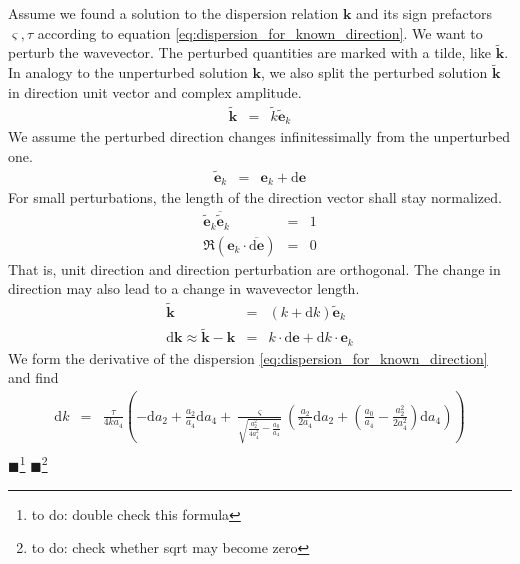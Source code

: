 \documentclass[12pt,a4paper,twoside,openright,BCOR10mm,headsepline,titlepage,abstracton,chapterprefix,final]{scrreprt}
\newcommand\Vector[1]{{\mathbf{#1}}}
\newcommand\wavenumber{k}
\newcommand\Wavevector{\Vector{\wavenumber}}
\newcommand{\remark}[1]{{\color{red}$\blacksquare$}\footnote{{\color{red}#1}}}
\newcommand\totald{\textrm{d}}
\begin{document}
Assume we found a solution to the dispersion relation $\Wavevector$ and its sign prefactors $\varsigma, \tau$ according to equation \eqref{eq:dispersion_for_known_direction}.
We want to perturb the wavevector. 
The perturbed quantities are marked with a tilde, like $\tilde{\Wavevector}$.
In analogy to the unperturbed solution $\Wavevector$, we also split the perturbed solution $\tilde{\Wavevector}$
in direction unit vector and complex amplitude.
\begin{eqnarray}
 \tilde{\Wavevector} &=& \tilde{\wavenumber} \tilde{\Vector{e}}_{\wavenumber}
\end{eqnarray}
We assume the perturbed direction changes infinitessimally from the unperturbed one.
\begin{eqnarray}
 \tilde{\Vector{e}}_\wavenumber &=& \Vector{e}_\wavenumber + \totald\Vector{e} 
\end{eqnarray}
For small perturbations, the length of the direction vector shall stay normalized.
\begin{eqnarray}
 \tilde{\Vector{e}}_\wavenumber \overline{\tilde{\Vector{e}}}_\wavenumber &=& 1 \\
 \Re \left( \Vector{e}_\wavenumber \cdot \overline{\totald\Vector{e}} \right) &=& 0 \label{eq:perturbation_unit_orthogonality}
\end{eqnarray}
That is, unit direction and direction perturbation are orthogonal.
The change in direction may also lead to a change in wavevector length.
\begin{eqnarray}
 \tilde{\Wavevector} &=& 
     \left( 
         \wavenumber + \totald \wavenumber 
     \right)
     \tilde{\Vector{e}}_\wavenumber 
 \\
 \totald \Wavevector \approx \tilde{\Wavevector} - \Wavevector &=& \wavenumber \cdot \totald\Vector{e} + \totald \wavenumber \cdot \Vector{e}_\wavenumber
\end{eqnarray}
We form the derivative of the dispersion \ref{eq:dispersion_for_known_direction} and find
\begin{eqnarray}
 \totald \wavenumber &=&
     \frac{\tau}{4 \wavenumber a_4}
     \left(
         - \totald a_2 + \frac{a_2}{a_4} \totald a_4 
         +  \frac{\varsigma}{\sqrt{\frac{a_2^2}{4 a_4^2} - \frac{a_0}{a_4}}}
                \left( \frac{a_2}{2 a_4} \totald a_2 + \left( \frac{a_0}{a_4} - \frac{a_2^2}{2 a_4^2} \right) \totald a_4 \right)
     \right)
 \nonumber\\
\end{eqnarray}
\remark{to do: double check this formula}
\remark{to do: check whether sqrt may become zero}
\end{document}
